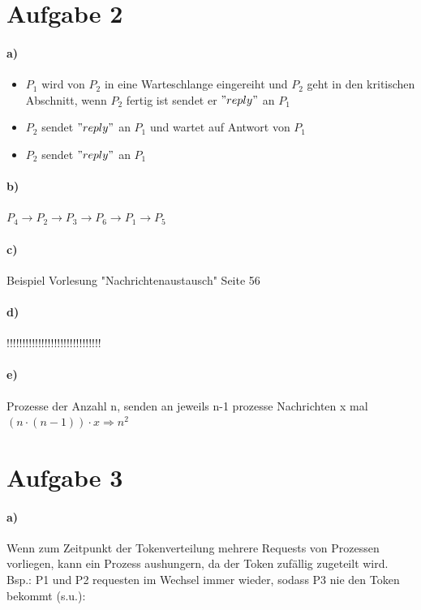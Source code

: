 \documentclass{scrartcl}
\begin{document}
		
		
		\section*{Aufgabe 2}
			\paragraph*{a)}
				\begin{itemize}
					\item $P_1$ wird von $P_2$ in eine Warteschlange eingereiht und $P_2$ geht in den kritischen Abschnitt, wenn $P_2$ fertig ist sendet er $"reply"$ an $P_1$
					\item $P_2$ sendet $"reply"$ an $P_1$ und wartet auf Antwort von $P_1$
					\item $P_2$ sendet $"reply"$ an $P_1$
				\end{itemize}
			
			\paragraph*{b)}
			$P_4 \rightarrow P_2 \rightarrow P_3 \rightarrow P_6 \rightarrow P_1 \rightarrow P_5$
			
			\paragraph*{c)}
			Beispiel Vorlesung "Nachrichtenaustausch" Seite 56
			
			\paragraph*{d)}
			!!!!!!!!!!!!!!!!!!!!!!!!!!!!!!
			
			\paragraph*{e)}
			Prozesse der Anzahl n, senden an jeweils n-1 prozesse Nachrichten x mal\\
			$(n \cdot (n-1)) \cdot x \Rightarrow n^2$\pagebreak
			
			
		\section*{Aufgabe 3}
			\paragraph*{a)}
				Wenn zum Zeitpunkt der Tokenverteilung mehrere Requests von Prozessen vorliegen, kann ein Prozess aushungern, da der Token zufällig zugeteilt wird.\\
				Bsp.: P1 und P2 requesten im Wechsel immer wieder, sodass P3 nie den Token bekommt (s.u.):\\[2em]
						
\end{document}
